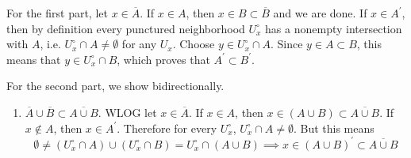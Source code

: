   \begin{solution}
    For the first part, let $x \in \overline{A}$. If $x \in A$, then $x \in B \subset \overline{B}$ and we are done. If $x \in A^\prime$, then by definition every punctured neighborhood $U_x^\circ$ has a nonempty intersection with $A$, i.e. $U_x^\circ \cap A \neq \emptyset$ for any $U_x$. Choose $y \in U_x^\circ \cap A$. Since $y \in A \subset B$, this means that $y \in U_x^\circ \cap B$, which proves that $A^\prime \subset B^\prime$. 

    For the second part, we show bidirectionally. 
    \begin{enumerate}
      \item $\overline{A} \cup \overline{B} \subset \overline{A \cup B}$. WLOG let $x \in \overline{A}$. If $x \in A$, then $x \in (A \cup B) \subset \overline{A \cup B}$. If $x \not\in A$, then $x \in A^\prime$. Therefore for every $U_x^\circ$, $U_x^\circ \cap A \neq \emptyset$. But this means 
      \begin{equation}
        \emptyset \neq (U_x^\circ \cap A) \cup (U_x^\circ \cap B) = U_x^\circ \cap (A \cup B) \implies x \in (A \cup B)^\prime \subset \overline{A \cup B}
      \end{equation}


\end{enumerate}
\end{solution}
